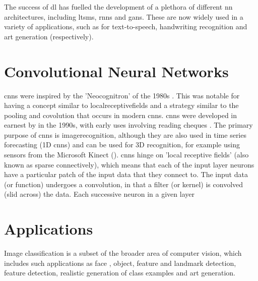 The success of  \gls{dl} has fuelled the development of a plethora of different  \gls{nn} architectures, including \gls{ltsm}s, \gls{rnn}s and \gls{gan}s. These are now widely used in a variety of applications, such as for text-to-speech, handwriting recognition and art generation (respectively).  
\bigskip %

\section{Convolutional Neural Networks}

\gls{cnn}s were inspired by the 'Neocognitron' of the 1980s \cite{neocognitron_proposal} \cite{neocognitron}. This was notable for having a concept similar to \gls{localreceptivefields} and a strategy similar to the pooling and covolution that occurs in modern \gls{cnn}s. \gls{cnn}s were developed in earnest by in the 1990s, with early uses involving reading cheques \cite{lecun_cheques}. The primary purpose of \gls{cnn}s is \gls{imagerecognition}, although they are also used in time series forecasting (1D \gls{cnn}s) and can be used for 3D recognition, for example using sensors from the Microsoft Kinect (\cite{3d_conv}). \gls{cnn}s hinge on 'local receptive fields' (also known as sparse connectively), which means that each of the input layer neurons have a particular patch of the input data that they connect to. The input data (or function) undergoes a convolution, in that a filter (or kernel) is convolved (slid across) the data. Each successive \gls{neuron} in a given layer \cite[Chapter~5]{good_fellow_2016}



\section{Applications}

Image classification is a subset of the broader area of computer vision, which includes such applications as face , object, feature and landmark detection, feature detection, realistic  generation of class examples and art generation.  
\bigskip

